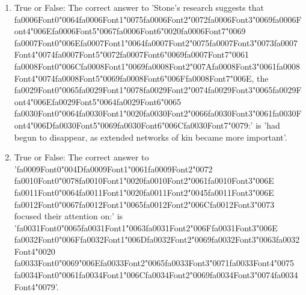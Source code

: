 \documentclass[12pt]{article}
\begin{document}
\begin{enumerate}[label=\arabic*.]
\item True or False: The correct answer to 'Stone's research suggests that {\csname fa0006Font0\endcsname\char"0064}{\csname fa0006Font1\endcsname\char"0075}{\csname fa0006Font2\endcsname\char"0072}{\csname fa0006Font3\endcsname\char"0069}{\csname fa0006Font4\endcsname\char"006E}{\csname fa0006Font5\endcsname\char"0067}{\csname fa0006Font6\endcsname\char"0020}{\csname fa0006Font7\endcsname\char"0069} {\csname fa0007Font0\endcsname\char"006E}{\csname fa0007Font1\endcsname\char"0064}{\csname fa0007Font2\endcsname\char"0075}{\csname fa0007Font3\endcsname\char"0073}{\csname fa0007Font4\endcsname\char"0074}{\csname fa0007Font5\endcsname\char"0072}{\csname fa0007Font6\endcsname\char"0069}{\csname fa0007Font7\endcsname\char"0061} {\csname fa0008Font0\endcsname\char"006C}{\csname fa0008Font1\endcsname\char"0069}{\csname fa0008Font2\endcsname\char"007A}{\csname fa0008Font3\endcsname\char"0061}{\csname fa0008Font4\endcsname\char"0074}{\csname fa0008Font5\endcsname\char"0069}{\csname fa0008Font6\endcsname\char"006F}{\csname fa0008Font7\endcsname\char"006E}, the {\csname fa0029Font0\endcsname\char"0065}{\csname fa0029Font1\endcsname\char"0078}{\csname fa0029Font2\endcsname\char"0074}{\csname fa0029Font3\endcsname\char"0065}{\csname fa0029Font4\endcsname\char"006E}{\csname fa0029Font5\endcsname\char"0064}{\csname fa0029Font6\endcsname\char"0065} {\csname fa0030Font0\endcsname\char"0064}{\csname fa0030Font1\endcsname\char"0020}{\csname fa0030Font2\endcsname\char"0066}{\csname fa0030Font3\endcsname\char"0061}{\csname fa0030Font4\endcsname\char"006D}{\csname fa0030Font5\endcsname\char"0069}{\csname fa0030Font6\endcsname\char"006C}{\csname fa0030Font7\endcsname\char"0079}:' is 'had begun to disappear, as extended networks of kin became more important'.
\item True or False: The correct answer to '{\csname fa0009Font0\endcsname\char"004D}{\csname fa0009Font1\endcsname\char"0061}{\csname fa0009Font2\endcsname\char"0072} {\csname fa0010Font0\endcsname\char"0078}{\csname fa0010Font1\endcsname\char"0020}{\csname fa0010Font2\endcsname\char"0061}{\csname fa0010Font3\endcsname\char"006E} {\csname fa0011Font0\endcsname\char"0064}{\csname fa0011Font1\endcsname\char"0020}{\csname fa0011Font2\endcsname\char"0045}{\csname fa0011Font3\endcsname\char"006E} {\csname fa0012Font0\endcsname\char"0067}{\csname fa0012Font1\endcsname\char"0065}{\csname fa0012Font2\endcsname\char"006C}{\csname fa0012Font3\endcsname\char"0073} focused their attention on:' is '{\csname fa0031Font0\endcsname\char"0065}{\csname fa0031Font1\endcsname\char"0063}{\csname fa0031Font2\endcsname\char"006F}{\csname fa0031Font3\endcsname\char"006E} {\csname fa0032Font0\endcsname\char"006F}{\csname fa0032Font1\endcsname\char"006D}{\csname fa0032Font2\endcsname\char"0069}{\csname fa0032Font3\endcsname\char"0063}{\csname fa0032Font4\endcsname\char"0020} {\csname fa0033Font0\endcsname\char"0069}{\char"006E}{\csname fa0033Font2\endcsname\char"0065}{\csname fa0033Font3\endcsname\char"0071}{\csname fa0033Font4\endcsname\char"0075} {\csname fa0034Font0\endcsname\char"0061}{\csname fa0034Font1\endcsname\char"006C}{\csname fa0034Font2\endcsname\char"0069}{\csname fa0034Font3\endcsname\char"0074}{\csname fa0034Font4\endcsname\char"0079}'.

\end{enumerate}
\end{document}
